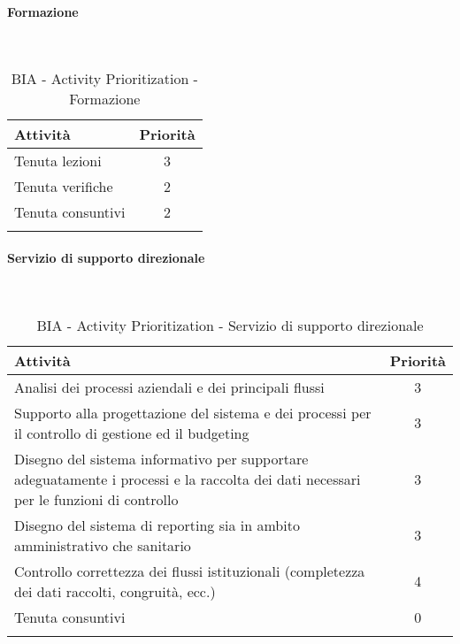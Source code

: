 \newpage
\paragraph{Formazione}
\textcolor{white}{.} \\
\renewcommand\arraystretch{1,5}
\begin{longtable}{p{11cm} c }
\toprule
\textbf{Attività} & \textbf{Priorità} \\
\toprule
Tenuta lezioni & 3 \\
Tenuta verifiche & 2 \\
Tenuta consuntivi & 2 \\
\bottomrule
\caption{BIA - Activity Prioritization - Formazione}
\end{longtable}

\paragraph{Servizio di supporto direzionale}
\textcolor{white}{.} \\
\renewcommand\arraystretch{1,5}
\begin{longtable}{p{11cm} c }
\toprule
\textbf{Attività} & \textbf{Priorità} \\
\toprule
Analisi dei processi aziendali e dei principali flussi   & 3 \\
Supporto  alla  progettazione  del  sistema  e  dei  processi  per  il  controllo  di  gestione  ed  il budgeting  & 3 \\
Disegno del sistema informativo per  supportare adeguatamente i processi e la raccolta dei 
dati necessari per le funzioni di controllo  & 3 \\
Disegno del sistema di reporting sia in ambito amministrativo che sanitario  & 3 \\
Controllo correttezza dei flussi istituzionali (completezza dei dati raccolti, congruità, ecc.)  & 4 \\
Tenuta consuntivi & 0 \\
\bottomrule
\caption{BIA - Activity Prioritization - Servizio di supporto direzionale}
\end{longtable}

\newpage
